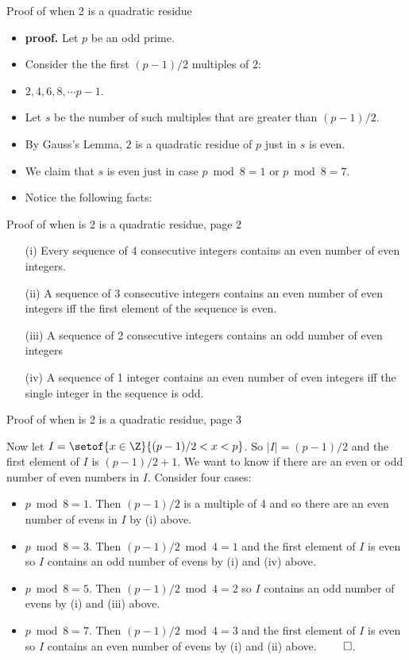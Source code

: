 \documentclass[handout]{beamer}
\begin{document}
\begin{frame}{Proof of when 2 is a quadratic residue}

\begin{itemize}
  \item \textbf{proof.}  Let $p$ be an odd prime.
  \item Consider the the first $(p-1)/2$ multiples of $2$:
  \item  $2, 4, 6, 8, \cdots p-1$.
  \item Let $s$ be the number of such multiples that are greater than $(p-1)/2$.
  \item By Gauss's Lemma, $2$ is a quadratic residue of $p$ just in $s$ is even.
  \item We claim that $s$ is even just in case $p\bmod 8 = 1$ or $p\bmod 8 = 7$.
  \item Notice the following facts:
\end{itemize}

\end{frame}

\begin{frame}{Proof of when is 2 is a quadratic residue, page 2}

\begin{enumerate}
\item[(i)] Every sequence of 4 consecutive integers contains an even number of even integers.
\item[(ii)] A sequence of 3 consecutive integers contains an even number of even integers iff the first element of the sequence is even.
\item[(iii)] A sequence of 2 consecutive integers contains an odd number of even integers
\item[(iv)] A sequence of 1 integer contains an even number of even integers iff the single integer in the sequence is odd.
\end{enumerate}

\end{frame}

\begin{frame}{Proof of when is 2 is a quadratic residue, page 3}

Now let $I=\setof{x\in\Z}{(p-1)/2 < x < p}$. So $|I|=(p-1)/2$ and the first element of $I$ is $(p-1)/2 + 1$.
We want to know if there are an even or odd number of even numbers in $I$.
Consider four cases:

\begin{itemize}
\item $p\bmod 8 = 1$. Then $(p-1)/2$ is a multiple of 4 and so there are an even number of evens in $I$ by (i) above.
\item $p\bmod 8 = 3$. Then $(p-1)/2 \bmod 4 = 1$ and the first element of $I$ is even so $I$ contains an odd number of evens by (i) and (iv) above.
\item $p\bmod 8 = 5$. Then $(p-1)/2 \bmod 4 = 2$ so $I$ contains an odd number of evens by (i) and (iii) above.
\item $p\bmod 8 = 7$. Then $(p-1)/2 \bmod 4 = 3$ and the first element of $I$ is even so $I$ contains an even number of evens by (i) and (ii) above. $\qed$.
\end{itemize}

\end{frame}
\end{document}
